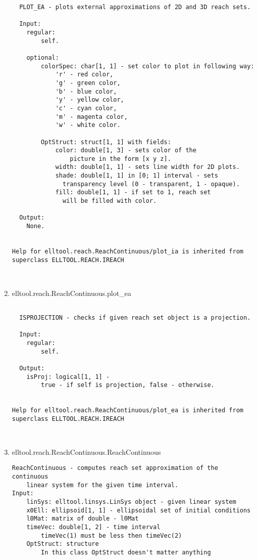 \begin{enumerate}
\begin{lstlisting}
  PLOT_EA - plots external approximations of 2D and 3D reach sets.

  Input:
    regular:
        self.

    optional:
        colorSpec: char[1, 1] - set color to plot in following way:
            'r' - red color,
            'g' - green color,
            'b' - blue color,
            'y' - yellow color,
            'c' - cyan color,
            'm' - magenta color,
            'w' - white color.

        OptStruct: struct[1, 1] with fields:
            color: double[1, 3] - sets color of the
                picture in the form [x y z].
            width: double[1, 1] - sets line width for 2D plots.
            shade: double[1, 1] in [0; 1] interval - sets
              transparency level (0 - transparent, 1 - opaque).
            fill: double[1, 1] - if set to 1, reach set
              will be filled with color.

  Output:
    None.


Help for elltool.reach.ReachContinuous/plot_ia is inherited from superclass ELLTOOL.REACH.IREACH



\end{lstlisting}
\fontfamily{\familydefault}
\selectfont
\item {elltool.reach.ReachContinuous.plot\_ea}
\selectfont
\begin{lstlisting}

  ISPROJECTION - checks if given reach set object is a projection.

  Input:
    regular:
        self.

  Output:
    isProj: logical[1, 1] -
        true - if self is projection, false - otherwise.


Help for elltool.reach.ReachContinuous/plot_ea is inherited from superclass ELLTOOL.REACH.IREACH



\end{lstlisting}
\fontfamily{\familydefault}
\selectfont
\item {elltool.reach.ReachContinuous.ReachContinuous}
\selectfont
\begin{lstlisting}
ReachContinuous - computes reach set approximation of the continuous
    linear system for the given time interval.
Input:
    linSys: elltool.linsys.LinSys object - given linear system
    x0Ell: ellipsoid[1, 1] - ellipsoidal set of initial conditions
    l0Mat: matrix of double - l0Mat
    timeVec: double[1, 2] - time interval
        timeVec(1) must be less then timeVec(2)
    OptStruct: structure
        In this class OptStruct doesn't matter anything


\end{lstlisting}
\end{enumerate}
